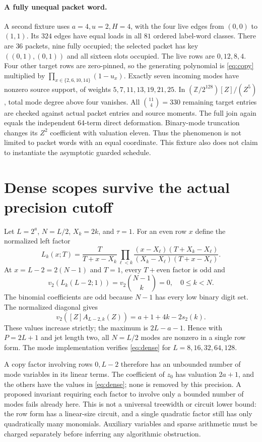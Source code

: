 \documentclass[11pt]{article}
\begin{document}
\paragraph{A fully unequal packet word.}
A second fixture uses $a=4,u=2,H=4$, with the four live edges from
$(0,0)$ to $(1,1)$. Its $324$ edges have equal loads in all $81$ ordered
label-word classes. There are $36$ packets, nine fully occupied; the
selected packet has key $((0,1),(0,1))$ and all sixteen slots occupied.
The live rows are $0,12,8,4$. Four other target rows are zero-pinned,
so the generating polynomial is \eqref{eq:copy} multiplied by
$\prod_{x\in\{2,6,10,14\}}(1-u_x)$. Exactly seven incoming modes have
nonzero source support, of weights $5,7,11,13,19,21,25$.
In $(\mathbb Z/2^{128})[Z]/(Z^5)$, total mode degree above four vanishes.
All $\binom{11}{4}=330$ remaining target entries are checked against
actual packet entries and source moments. The full join again equals
the independent 64-term direct deformation. Binary-mode truncation
changes its $Z^2$ coefficient with valuation eleven. Thus the phenomenon
is not limited to packet words with an equal coordinate. This fixture
also does not claim to instantiate the asymptotic guarded schedule.

\section{Dense scopes survive the actual precision cutoff}
Let $L=2^a$, $N=L/2$, $X_k=2k$, and $\tau=1$. For an even row $x$ define
the normalized left factor
\[
 L_k(x;T)=\frac{T}{T+x-X_k}
  \prod_{\ell<k}
   \frac{(x-X_\ell)(T+X_k-X_\ell)}
        {(X_k-X_\ell)(T+x-X_\ell)}.
\]
At $x=L-2=2(N-1)$ and $T=1$, every $T+$even factor is odd and
\[
 v_2(L_k(L-2;1))=v_2\binom{N-1}{k}=0,
 \quad 0\le k<N.
\]
The binomial coefficients are odd because $N-1$ has every low binary
digit set. The normalized diagonal gives
\begin{equation}
 v_2([Z]A_{L-2,k}(Z))=a+1+4k-2s_2(k).
 \label{eq:dense}
\end{equation}
These values increase strictly; the maximum is $2L-a-1$.
Hence with $P=2L+1$ and jet length two, all $N=L/2$ modes are nonzero
in a single row form. The mode implementation verifies \eqref{eq:dense}
for $L=8,16,32,64,128$.

A copy factor involving rows $0,L-2$ therefore has an unbounded number
of mode variables in its linear terms. The coefficient of $z_0$ has
valuation $2a+1$, and the others have the values in \eqref{eq:dense};
none is removed by this precision. A proposed invariant requiring each
factor to involve only a bounded number of modes fails already here.
This is not a universal treewidth or circuit lower bound: the row form
has a linear-size circuit, and a single quadratic factor still has only
quadratically many monomials. Auxiliary variables and sparse arithmetic
must be charged separately before inferring any algorithmic obstruction.
\end{document}
